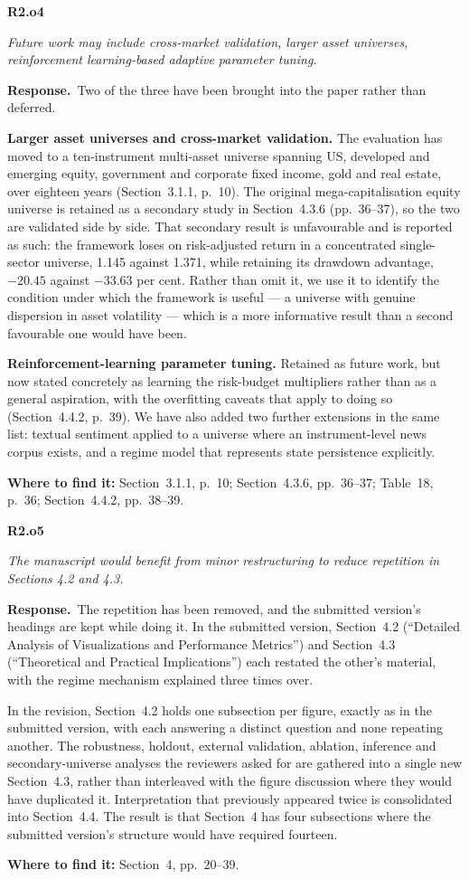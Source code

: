 \documentclass[11pt,a4paper]{article}
\newcommand{\rc}[2]{%
  \par\medskip\noindent
  \colorbox{qbg}{\parbox{\dimexpr\linewidth-2\fboxsep}{%
  \textbf{#1}\par\smallskip\itshape #2}}\par\nopagebreak}
\newcommand{\resp}{\par\medskip\noindent\textbf{Response.}\ }
\newcommand{\where}[1]{\par\smallskip\noindent\textcolor{blue!55!black}{\textbf{Where to find it:} #1}\par}
\begin{document}
\rc{R2.o4}{Future work may include cross-market validation, larger asset universes,
reinforcement learning-based adaptive parameter tuning.}

\resp Two of the three have been brought into the paper rather than deferred.

\textbf{Larger asset universes and cross-market validation.} The evaluation has moved to a
ten-instrument multi-asset universe spanning US, developed and emerging equity, government
and corporate fixed income, gold and real estate, over eighteen years (Section~3.1.1,
p.~10). The original mega-capitalisation equity universe is retained as a secondary study in
Section~4.3.6 (pp.~36--37), so the two are validated side by side. That secondary result is
unfavourable and is reported as such: the framework loses on risk-adjusted return in a
concentrated single-sector universe, 1.145 against 1.371, while retaining its drawdown
advantage, $-20.45$ against $-33.63$ per cent. Rather than omit it, we use it to identify
the condition under which the framework is useful --- a universe with genuine dispersion in
asset volatility --- which is a more informative result than a second favourable one would
have been.

\textbf{Reinforcement-learning parameter tuning.} Retained as future work, but now stated
concretely as learning the risk-budget multipliers rather than as a general aspiration,
with the overfitting caveats that apply to doing so (Section~4.4.2, p.~39). We have also
added two further extensions in the same list: textual sentiment applied to a universe
where an instrument-level news corpus exists, and a regime model that represents state
persistence explicitly.
\where{Section~3.1.1, p.~10; Section~4.3.6, pp.~36--37; Table~18, p.~36; Section~4.4.2,
pp.~38--39.}

\rc{R2.o5}{The manuscript would benefit from minor restructuring to reduce repetition in
Sections 4.2 and 4.3.}

\resp The repetition has been removed, and the submitted version's headings are kept while
doing it. In the submitted version, Section~4.2 (``Detailed Analysis of Visualizations and
Performance Metrics'') and Section~4.3 (``Theoretical and Practical Implications'') each
restated the other's material, with the regime mechanism explained three times over.

In the revision, Section~4.2 holds one subsection per figure, exactly as in the submitted
version, with each answering a distinct question and none repeating another. The
robustness, holdout, external validation, ablation, inference and secondary-universe
analyses the reviewers asked for are gathered into a single new Section~4.3, rather than
interleaved with the figure discussion where they would have duplicated it. Interpretation
that previously appeared twice is consolidated into Section~4.4. The result is that
Section~4 has four subsections where the submitted version's structure would have required
fourteen.
\where{Section~4, pp.~20--39.}
\end{document}
